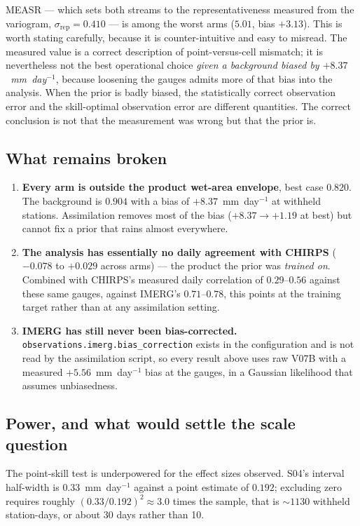 MEASR --- which sets both streams to the representativeness measured from the
variogram, $\sigma_{\mathrm{rep}} = 0.410$ --- is among the worst arms
($5.01$, bias $+3.13$). This is worth stating carefully, because it is
counter-intuitive and easy to misread. The measured value is a correct
description of point-versus-cell mismatch; it is nevertheless not the best
operational choice \emph{given a background biased by $+8.37$~mm~day$^{-1}$},
because loosening the gauges admits more of that bias into the analysis. When
the prior is badly biased, the statistically correct observation error and the
skill-optimal observation error are different quantities. The correct
conclusion is not that the measurement was wrong but that the prior is.

\subsection{What remains broken}

\begin{enumerate}
  \item \textbf{Every arm is outside the product wet-area envelope}, best case
    $0.820$. The background is $0.904$ with a bias of $+8.37$~mm~day$^{-1}$ at
    withheld stations. Assimilation removes most of the bias
    ($+8.37 \rightarrow +1.19$ at best) but cannot fix a prior that rains
    almost everywhere.
  \item \textbf{The analysis has essentially no daily agreement with CHIRPS}
    ($-0.078$ to $+0.029$ across arms) --- the product the prior was
    \emph{trained on}. Combined with CHIRPS's measured daily correlation of
    $0.29$--$0.56$ against these same gauges, against IMERG's $0.71$--$0.78$,
    this points at the training target rather than at any assimilation setting.
  \item \textbf{IMERG has still never been bias-corrected.}
    \texttt{observations.imerg.bias\_correction} exists in the configuration
    and is not read by the assimilation script, so every result above uses raw
    V07B with a measured $+5.56$~mm~day$^{-1}$ bias at the gauges, in a
    Gaussian likelihood that assumes unbiasedness.
\end{enumerate}

\subsection{Power, and what would settle the scale question}

The point-skill test is underpowered for the effect sizes observed. S04's
interval half-width is $0.33$~mm~day$^{-1}$ against a point estimate of
$0.192$; excluding zero requires roughly $(0.33/0.192)^2 \approx 3.0$ times the
sample, that is ${\sim}1130$ withheld station-days, or about 30 days rather
than 10.

